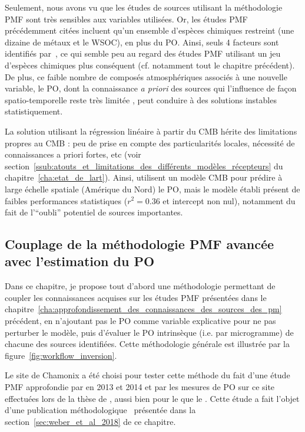 Seulement, nous avons vu que les études de sources utilisant la méthodologie PMF sont très
sensibles aux variables utilisées. Or, les études PMF précédemment citées incluent qu'un
ensemble d'espèces chimiques restreint (une dizaine de métaux et le WSOC), en plus du PO.
Ainsi, seuls 4 facteurs sont identifiés par~\cite{fangOxidative2016}, ce qui semble peu au regard
des études PMF utilisant un jeu d'espèces chimiques plus conséquent (cf.  notamment tout
le chapitre précédent). De plus, ce faible nombre de composés atmosphériques associés à
une nouvelle variable, le PO, dont la connaissance \textit{a priori} des sources qui
l'influence de façon spatio-temporelle reste très limitée , peut conduire à des solutions
instables statistiquement.

La solution utilisant la régression linéaire à partir du CMB hérite des limitations
propres au CMB : peu de prise en compte des particularités locales, nécessité de
connaissances a priori fortes, etc (voir
section~\ref{ssub:atouts_et_limitations_des_différents_modèles_récepteurs} du
chapitre~\ref{cha:etat_de_lart}).  Ainsi, \cite{batesSource2018} utilisent un modèle CMB
pour prédire à large échelle spatiale (Amérique du Nord) le PO, mais le modèle établi
présent de faibles performances statistiques ($r^2 = 0.36$ et intercept non nul),
notamment du fait de l'``oubli'' potentiel de sources importantes.

\subsection{Couplage de la méthodologie PMF avancée avec l'estimation du PO}%
\label{sub:couplage_de_pmf_avancée_avec_l_estimation_du_po}

Dans ce chapitre, je propose tout d'abord une méthodologie permettant de coupler les
connaissances acquises sur les études PMF présentées
dans le chapitre~\ref{cha:approfondissement_des_connaissances_des_sources_des_pm}
précédent, en n'ajoutant pas le PO comme variable explicative pour ne pas perturber le
modèle, puis d'évaluer le PO intrinsèque (i.e. par microgramme) de chacune des sources
identifiées. Cette méthodologie générale est illustrée par la figure~\ref{fig:workflow_inversion}.

Le site de Chamonix a été choisi pour tester cette méthode du fait d'une étude PMF
approfondie par \cite{chevrierChauffage2016} en 2013 et 2014 et par les mesures de PO sur
ce site effectuées lors de la thèse de \cite{calasPollution2017}, aussi bien pour le
\POAA{} que le \PODTT. Cette étude a fait l'objet d'une publication
méthodologique~\autocite{weberApportionment2018} présentée dans la
section~\ref{sec:weber_et_al_2018} de ce chapitre.

